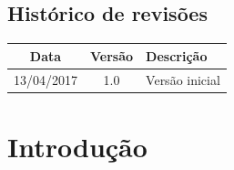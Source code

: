 \documentclass[11pt]{report}
\begin{document}
\clearpage

\section*{Histórico de revisões}
\noindent
      \begin{tabular}{|c|c|p{12cm}|} \hline
         \textbf{Data} & \textbf{Versão} & \textbf{Descrição} \\ \hline \hline
         13/04/2017 & 1.0 & Versão inicial \\ \hline
      \end{tabular}

\clearpage


\tableofcontents
\printglossaries
\clearpage
\pagestyle{fancyplain}




\chapter{Introdução}
\label{cap:introducao}



%
%
%
\end{document}

